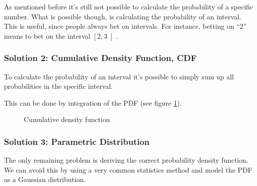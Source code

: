 \documentclass[../main/Notes.tex]{subfiles}
\begin{document}
As mentioned before it's still not possible to calculate the probability of a specific number. What is possible though, is calculating the probability of an interval. This is useful, since people always bet on intervals. For instance, betting on ``2'' means to bet on the interval $\left[2,3\right[$.

\subsubsection[Cumulative Density Function (CDF)]{Solution 2: Cumulative Density Function, CDF}
To calculate the probability of an interval it's possible to simply sum up all probabilities in the specific interval.

This can be done by integration of the PDF (see figure \ref{fig:2014-05-09_pdf_to_cdf}).

\begin{figure}[!ht]
\centering
{}
\caption{Cumulative density function}
\label{fig:2014-05-09_pdf_to_cdf}
\end{figure}


\subsubsection[Parametric Gaussian Distribution]{Solution 3: Parametric Distribution}
The only remaining problem is deriving the correct probability density function. We can avoid this by using a very common statistics method and model the PDF as a Gaussian distribution.
\end{document}
